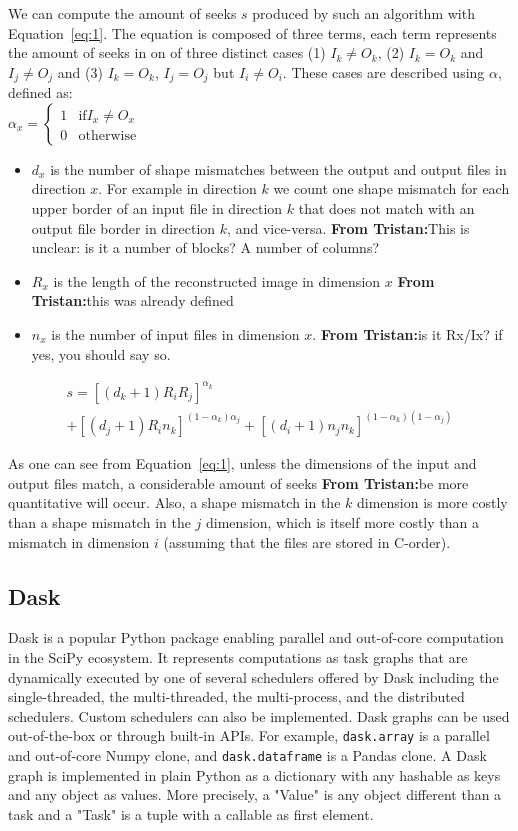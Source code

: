 \documentclass[conference]{IEEEtran}
\newcommand{\tristan}[1]{\color{orange}\textbf{From Tristan:}#1\color{black}}
\begin{document}
We can compute the amount of seeks $s$ produced by such an algorithm with
Equation~\ref{eq:1}. The equation is composed of three terms, each term represents
the amount of seeks in on of three distinct cases (1) $I_k \neq O_k$, (2)
$I_k = O_k$ and $I_j \neq O_j$ and (3) $I_k = O_k$, $I_j = O_j$ but $I_i \neq O_i$.
These cases are described using $\alpha$, defined as: \\
$\alpha_x = \begin{cases}
   1 & \mathrm{if} I_x \neq O_x \\
   0 & \mathrm{otherwise}
\end{cases}$
\begin{itemize}
  \item $d_x$ is the number of shape mismatches between the output and output files
  in direction $x$. For example in direction $k$ we count one shape mismatch for
  each upper border of an input file in direction $k$ that does not match with
  an output file border in direction $k$, and vice-versa. \tristan{This is unclear: is it a number of blocks? A number of columns?}
  \item $R_x$ is the length of the reconstructed image in dimension $x$ \tristan{this was already defined}
  \item $n_x$ is the number of input files in dimension $x$. \tristan{is it Rx/Ix? if yes, you should say so.}
\end{itemize}

\begin{multline} \label{eq:1}
s = [(d_k+1)R_iR_j]^{\alpha_k} \\ + [(d_j+1)R_in_k]^{(1-\alpha_k)\alpha_j} + [(d_i+1)n_jn_k]^{(1-\alpha_k)(1-\alpha_j)}
\end{multline}

As one can see from Equation~\ref{eq:1}, unless the dimensions of the input and
output files match, a considerable amount of seeks \tristan{be more quantitative} will occur. Also, a shape mismatch
in the $k$ dimension is more costly than a shape mismatch in the $j$ dimension,
which is itself more costly than a mismatch in dimension $i$ (assuming that the
files are stored in C-order).

\subsection{Dask}

Dask is a popular Python package enabling parallel and out-of-core
computation in the SciPy ecosystem. It represents computations as task
graphs that are dynamically executed by one of several schedulers offered
by Dask including the single-threaded, the multi-threaded, the
multi-process, and the distributed schedulers. Custom schedulers can also
be implemented. Dask graphs can be used out-of-the-box or through built-in
APIs. For example, \texttt{dask.array} is a parallel and out-of-core Numpy
clone, and
\texttt{dask.dataframe} is a Pandas clone. A Dask graph is implemented in
plain Python as a dictionary with any hashable as keys and any object as
values. More precisely, a "Value" is any object different than a task and a
"Task" is a tuple with a callable as first element.
\end{document}
